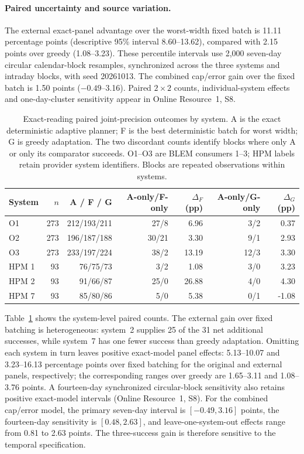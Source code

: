 \documentclass[12pt]{article}
\begin{document}
\paragraph{Paired uncertainty and source variation.}
The external exact-panel advantage over the worst-width fixed batch is
11.11 percentage points (descriptive 95\% interval 8.60--13.62), compared
with 2.15 points over greedy (1.08--3.23). These percentile intervals use
2,000 seven-day circular calendar-block resamples, synchronized across the
three systems and intraday blocks, with seed 20261013. The combined cap/error
gain over the fixed batch is 1.50 points ($-0.49$--3.16). Paired $2\times2$
counts, individual-system effects and one-day-cluster sensitivity appear in
Online Resource~1, S8.
\begin{table}[htbp]
\centering\small
\setlength{\tabcolsep}{4pt}
\begin{tabular}{lrrrrrr}
\toprule
System & $n$ & A / F / G & A-only/F-only & $\Delta_F$ (pp) & A-only/G-only & $\Delta_G$ (pp)\\
\midrule
O1 & 273 & 212/193/211 & 27/8 & 6.96 & 3/2 & 0.37\\
O2 & 273 & 196/187/188 & 30/21 & 3.30 & 9/1 & 2.93\\
O3 & 273 & 233/197/224 & 38/2 & 13.19 & 12/3 & 3.30\\
HPM 1 & 93 & 76/75/73 & 3/2 & 1.08 & 3/0 & 3.23\\
HPM 2 & 93 & 91/66/87 & 25/0 & 26.88 & 4/0 & 4.30\\
HPM 7 & 93 & 85/80/86 & 5/0 & 5.38 & 0/1 & -1.08\\
\bottomrule
\end{tabular}
\caption{Exact-reading paired joint-precision outcomes by system. A is the exact deterministic adaptive planner; F is the best deterministic batch for worst width; G is greedy adaptation. The two discordant counts identify blocks where only A or only its comparator succeeds. O1--O3 are BLEM consumers 1--3; HPM labels retain provider system identifiers. Blocks are repeated observations within systems.}
\label{tab:joint_system_effects}
\end{table}
Table~\ref{tab:joint_system_effects} shows the system-level paired counts.
The external gain over fixed batching is heterogeneous: system~2 supplies
25 of the 31 net additional successes, while system~7 has one fewer success
than greedy adaptation. Omitting each system in turn leaves positive exact-model
panel effects: 5.13--10.07 and 3.23--16.13 percentage points over fixed batching
for the original and external panels, respectively; the corresponding ranges
over greedy are 1.65--3.11 and 1.08--3.76 points. A fourteen-day
synchronized circular-block sensitivity also retains positive exact-model
intervals (Online Resource~1, S8). For the combined cap/error model, the
primary seven-day interval is $[-0.49,3.16]$ points, the fourteen-day
sensitivity is $[0.48,2.63]$, and leave-one-system-out effects range from
0.81 to 2.63 points. The three-success gain is therefore sensitive to the
temporal specification.
\end{document}
